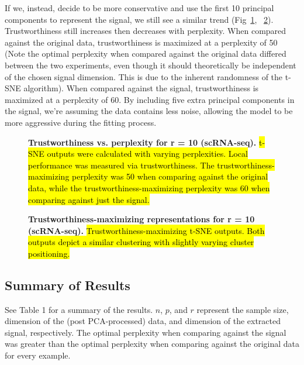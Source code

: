 \documentclass[10pt,letterpaper]{article}
\begin{document}
If we, instead, decide to be more conservative and use the first 10 principal components to represent the signal, we still see a similar trend (Fig~\ref{fig12}, ~\ref{fig13}). Trustworthiness still increases then decreases with perplexity. When compared against the original data, trustworthiness is maximized at a perplexity of 50 (Note the optimal perplexity when compared against the original data differed between the two experiments, even though it should theoretically be independent of the chosen signal dimension. This is due to the inherent randomness of the t-SNE algorithm). When compared against the signal, trustworthiness is maximized at a perplexity of 60. By including five extra principal components in the signal, we're assuming the data contains less noise, allowing the model to be more aggressive during the fitting process.

\begin{figure}[!h]
\caption{{\bf Trustworthiness vs. perplexity for r = 10 (scRNA-seq).}
\hl{t-SNE outputs were calculated with varying perplexities. Local performance was measured via trustworthiness. The trustworthiness-maximizing perplexity was 50 when comparing against the original data, while the trustworthiness-maximizing perplexity was 60 when comparing against just the signal.}}
\label{fig12}
\end{figure}

\begin{figure}[!h]
\caption{{\bf Trustworthiness-maximizing representations for r = 10 (scRNA-seq).}
\hl{Trustworthiness-maximizing t-SNE outputs. Both outputs depict a similar clustering with slightly varying cluster positioning.}}
\label{fig13}
\end{figure}

\subsection*{Summary of Results}
See Table 1 for a summary of the results. $n$, $p$, and $r$ represent the sample size, dimension of the (post PCA-processed) data, and dimension of the extracted signal, respectively. The optimal perplexity when comparing against the signal was greater than the optimal perplexity when comparing against the original data for every example.
\end{document}
